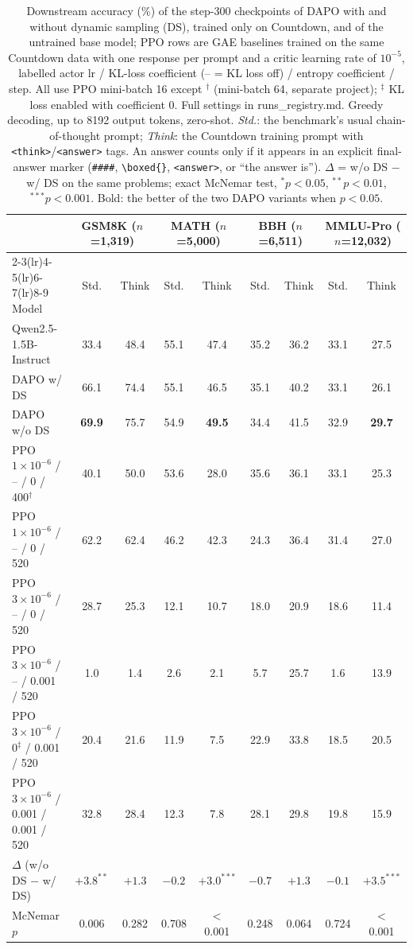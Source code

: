\begin{table}[t]
\centering
\small
\caption{Downstream accuracy (\%) of the step-300 checkpoints of DAPO with and without dynamic sampling (DS), trained only on Countdown, and of the untrained base model; PPO rows are GAE baselines trained on the same Countdown data with one response per prompt and a critic learning rate of $10^{-5}$, labelled actor lr / KL-loss coefficient (-- = KL loss off) / entropy coefficient / step. All use PPO mini-batch 16 except $^\dagger$ (mini-batch 64, separate project); $^\ddagger$ KL loss enabled with coefficient 0. Full settings in runs\_registry.md. Greedy decoding, up to 8192 output tokens, zero-shot. \emph{Std.}: the benchmark's usual chain-of-thought prompt; \emph{Think}: the Countdown training prompt with \texttt{<think>}/\texttt{<answer>} tags. An answer counts only if it appears in an explicit final-answer marker (\texttt{\#\#\#\#}, \texttt{\textbackslash boxed\{\}}, \texttt{<answer>}, or ``the answer is''). $\Delta$ = w/o DS $-$ w/ DS on the same problems; exact McNemar test, $^{*}p<0.05$, $^{**}p<0.01$, $^{***}p<0.001$. Bold: the better of the two DAPO variants when $p<0.05$.}
\label{tab:downstream}
\setlength{\tabcolsep}{5pt}
\begin{tabular}{lcccccccc}
\toprule
 & \multicolumn{2}{c}{GSM8K ($n$=1,319)} & \multicolumn{2}{c}{MATH ($n$=5,000)} & \multicolumn{2}{c}{BBH ($n$=6,511)} & \multicolumn{2}{c}{MMLU-Pro ($n$=12,032)} \\
\cmidrule(lr){2-3}\cmidrule(lr){4-5}\cmidrule(lr){6-7}\cmidrule(lr){8-9}
Model & Std. & Think & Std. & Think & Std. & Think & Std. & Think \\
\midrule
Qwen2.5-1.5B-Instruct & 33.4 & 48.4 & 55.1 & 47.4 & 35.2 & 36.2 & 33.1 & 27.5 \\
DAPO w/ DS & 66.1 & 74.4 & 55.1 & 46.5 & 35.1 & 40.2 & 33.1 & 26.1 \\
DAPO w/o DS & \textbf{69.9} & 75.7 & 54.9 & \textbf{49.5} & 34.4 & 41.5 & 32.9 & \textbf{29.7} \\
PPO $1{\times}10^{-6}$ / -- / 0 / 400$^\dagger$ & 40.1 & 50.0 & 53.6 & 28.0 & 35.6 & 36.1 & 33.1 & 25.3 \\
PPO $1{\times}10^{-6}$ / -- / 0 / 520 & 62.2 & 62.4 & 46.2 & 42.3 & 24.3 & 36.4 & 31.4 & 27.0 \\
PPO $3{\times}10^{-6}$ / -- / 0 / 520 & 28.7 & 25.3 & 12.1 & 10.7 & 18.0 & 20.9 & 18.6 & 11.4 \\
PPO $3{\times}10^{-6}$ / -- / 0.001 / 520 & 1.0 & 1.4 & 2.6 & 2.1 & 5.7 & 25.7 & 1.6 & 13.9 \\
PPO $3{\times}10^{-6}$ / 0$^\ddagger$ / 0.001 / 520 & 20.4 & 21.6 & 11.9 & 7.5 & 22.9 & 33.8 & 18.5 & 20.5 \\
PPO $3{\times}10^{-6}$ / 0.001 / 0.001 / 520 & 32.8 & 28.4 & 12.3 & 7.8 & 28.1 & 29.8 & 19.8 & 15.9 \\
\midrule
$\Delta$ (w/o DS $-$ w/ DS) & $+3.8^{**}$ & $+1.3$ & $-0.2$ & $+3.0^{***}$ & $-0.7$ & $+1.3$ & $-0.1$ & $+3.5^{***}$ \\
McNemar $p$ & 0.006 & 0.282 & 0.708 & $<$0.001 & 0.248 & 0.064 & 0.724 & $<$0.001 \\
\bottomrule
\end{tabular}
\end{table}
